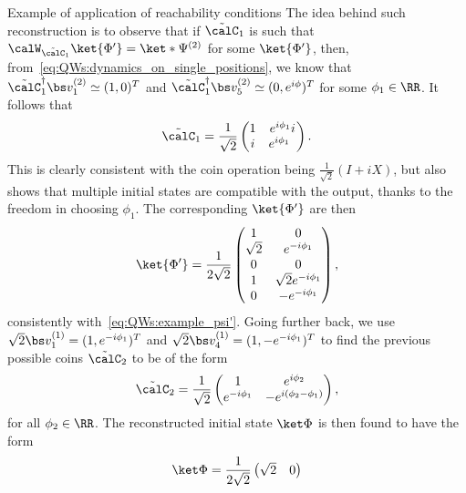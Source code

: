 \begin{examplebox}[label=ex:QWs:conditions_few_steps]{Example of application of reachability conditions}
    The idea behind such reconstruction is to observe that if $\tilde\calC_1$ is such that $\calW_{\tilde\calC_1}\ket{\Phi'}=\ket*{\Psi^{(2)}}$ for some $\ket{\Phi'}$, then, from~\cref{eq:QWs:dynamics_on_single_positions}, we know that $\tilde\calC_1^\dagger \bs v_1^{(2)}\simeq(1,0)^T$ and $\tilde\calC_1^\dagger \bs v_5^{(2)}\simeq(0,e^{i\phi})^T$ for some $\phi_1\in\RR$. It follows that
    \begin{equation}
        \tilde\calC_1 =
        \frac{1}{\sqrt2} \begin{pmatrix}
            1 & e^{i\phi_1}i \\
            i & e^{i\phi_1}\phantom{1}
        \end{pmatrix}.
    \end{equation}
    This is clearly consistent with the coin operation being $\frac{1}{\sqrt2}(I+iX)$, but also shows that multiple initial states are compatible with the output, thanks to the freedom in choosing $\phi_1$. The corresponding $\ket{\Phi'}$ are then
    \begin{equation}
        \ket{\Phi'} = \frac{1}{2\sqrt2}
        \begin{pmatrix}
            1 & 0 \\
            \sqrt2 & e^{-i\phi_1} \\
            0 & 0 \\
            1 & \sqrt2 e^{-i\phi_1} \\
            0 & -e^{-i\phi_1}
        \end{pmatrix},
    \end{equation}
    consistently with~\cref{eq:QWs:example_psi'}.
    Going further back, we use $\sqrt2\bs v_1^{(1)}=(1,e^{-i\phi_1})^T$ and $\sqrt2\bs v_4^{(1)}=(1,-e^{-i\phi_1})^T$ to find the previous possible coins $\tilde\calC_2$ to be of the form
    \begin{equation}
        \tilde\calC_2 = \frac{1}{\sqrt2} \begin{pmatrix}
            1 & e^{i\phi_2} \\
            e^{-i\phi_1} & -e^{i(\phi_2-\phi_1)}
        \end{pmatrix},
    \end{equation}
    for all $\phi_2\in\RR$. The reconstructed initial state $\ket\Phi$ is then found to have the form
    \begin{equation}
        \ket\Phi = \frac{1}{2\sqrt2}
        \begin{pmatrix}
            \sqrt2 & 0 \\

\end{pmatrix}
\end{equation}
\end{examplebox}
